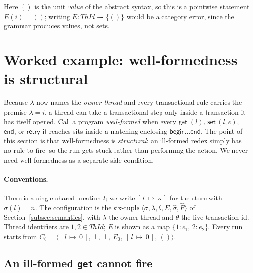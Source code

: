 \documentclass[manuscript,nonacm]{acmart}
\theoremstyle{acmdefinition}
\newcommand{\ThId}{\mathit{ThId}}   %
\newcommand{\unit}{()}
\newcommand{\bbegin}{\textsf{begin}}
\newcommand{\eend}{\textsf{end}}
\newcommand{\retry}{\textsf{retry}}
\newcommand{\getc}[1]{\textsf{get}\;(#1)}
\newcommand{\setc}[2]{\textsf{set}\,(#1,#2)}
\newcommand{\st}[1]{[\,l\,{\mapsto}\,#1\,]}          %
\newcommand{\emap}[1]{\{#1\}}                          %
\begin{document}
Here $\unit$ is the unit \emph{value} of the abstract syntax, so this is a
pointwise statement $E(i)=\unit$; writing $E : \ThId \rightharpoonup \{\unit\}$
would be a category error, since the grammar produces values, not sets.



\section{Worked example: well-formedness is structural}
\label{sec:examples}

Because $\lambda$ now names the \emph{owner thread} and every transactional rule
carries the premise $\lambda = i$, a thread can take a transactional step only
inside a transaction it has itself opened. Call a program \emph{well-formed} when
every $\getc{l}$, $\setc{l}{e}$, $\eend$, or $\retry$ it reaches sits inside a
matching enclosing $\bbegin\dots\eend$. The point of this section is that
well-formedness is \emph{structural}: an ill-formed redex simply has no rule to
fire, so the run gets stuck rather than performing the action. We never need
well-formedness as a separate side condition.

\paragraph{Conventions.}
There is a single shared location $l$; we write $\st{n}$ for the store with
$\sigma(l)=n$. The configuration is the six-tuple
$\langle\sigma,\lambda,\theta,E,\hat{\sigma},\hat{E}\rangle$ of
Section~\ref{subsec:semantics}, with $\lambda$ the owner thread and $\theta$ the live
transaction id. Thread identifiers are $1,2\in\ThId$; $E$ is shown as a map
$\emap{1{:}e_1,\,2{:}e_2}$. Every run starts from
$C_0=\langle \st{0},\ \bot,\ \bot,\ E_0,\ \st{0},\ \unit\rangle$.

\subsection{An ill-formed \texttt{get} cannot fire}
\end{document}
